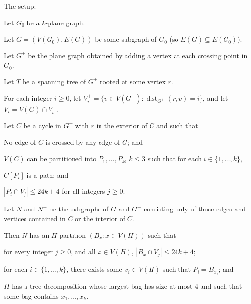 \documentclass{patmorin}
\DeclareMathOperator{\dist}{dist}
\begin{document}
\begin{lem} The setup:
  \begin{compactenum}
    \item Let $G_0$ be a $k$-plane graph.
    \item Let $G=(V(G_0), E(G))$ be some subgraph of $G_0$ (so $E(G)\subseteq E(G_0)$).
    \item Let $G^+$ be the plane graph obtained by adding a vertex at each crossing point in $G_0$.
    \item Let $T$ be a spanning tree of $G^+$ rooted at some vertex $r$.
    \item For each integer $i\ge 0$, let $V^+_i=\{v\in V(G^+):\dist_{G^+}(r,v)=i\}$, and let $V_i=V(G)\cap V^+_i$.
    \item Let $C$ be a cycle in $G^+$ with $r$ in the exterior of $C$ and such that
    \begin{compactenum} 
      \item No edge of $C$ is crossed by any edge of $G$; and
      \item $V(C)$ can be partitioned into $P_1,\ldots,P_k$, $k\le 3$ such that for each $i\in\{1,\ldots,k\}$,
      \begin{compactenum}
        \item $C[P_i]$ is a path; and
        \item $|P_i\cap V_j| \le 24k+4$ for all integers $j\ge 0$.
      \end{compactenum}
    \end{compactenum}
    \item Let $N$ and $N^+$ be the subgraphs of $G$ and $G^+$ consisting only of those edges and vertices contained in $C$ or the interior of $C$.
  \end{compactenum}
  Then $N$ has an $H$-partition $(B_x : x\in V(H))$ such that
  \begin{compactenum}
    \item for every integer $j\ge 0$, and all $x\in V(H)$, $|B_x\cap V_j|\le 24k+4$; 
    \item for each $i\in\{1,\ldots,k\}$, there exists some $x_i\in V(H)$ such that $P_i=B_{x_i}$; and
    \item $H$ has a tree decomposition whose largest bag has size at most 4 and such that some bag contains $x_1,\ldots,x_k$.
  \end{compactenum}
\end{lem}
\end{document}
